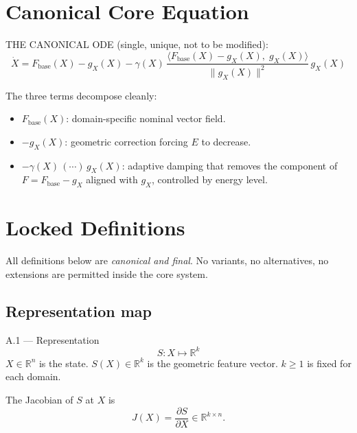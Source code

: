 \documentclass[11pt,oneside]{amsart}
\def\textbf#1{#1}%
\theoremstyle{plain}
\theoremstyle{definition}
\newcommand{\Xdot}{\dot{X}}
\newcommand{\gX}{g_X}
\newcommand{\Fbase}{F_{\mathrm{base}}}
\newcommand{\R}{\mathbb{R}}
\begin{document}
\section{Canonical Core Equation}
\label{sec:core}

\begin{lockbox}
\textbf{THE CANONICAL ODE (single, unique, not to be modified):}
\[
\boxed{
  \Xdot
  = \Fbase(X)
    - \gX(X)
    - \gamma(X)\,
      \frac{\langle \Fbase(X) - \gX(X),\; \gX(X)\rangle}
           {\|\gX(X)\|^{2}}\,
      \gX(X)
}
\]
\end{lockbox}

\noindent The three terms decompose cleanly:
\begin{itemize}[leftmargin=1.8em]
  \item $\Fbase(X)$: domain-specific nominal vector field.
  \item $-\gX(X)$: geometric correction forcing $E$ to decrease.
  \item $-\gamma(X)\,(\cdots)\,\gX(X)$: adaptive damping that removes the
        component of $F = \Fbase - \gX$ aligned with $\gX$, controlled by
        energy level.
\end{itemize}

\section{Locked Definitions}
\label{sec:defs}

All definitions below are \emph{canonical and final}. No variants, no
alternatives, no extensions are permitted inside the core system.

\subsection{Representation map}
\label{sec:rep}

\begin{defbox}{A.1 --- Representation}
\[
\boxed{S : X \longmapsto \R^{k}}
\]
$X \in \R^{n}$ is the state.
$S(X) \in \R^{k}$ is the geometric feature vector.
$k \geq 1$ is fixed for each domain.
\end{defbox}

\noindent The Jacobian of $S$ at $X$ is
\[
  J(X) = \frac{\partial S}{\partial X} \in \R^{k \times n}.
\]
\end{document}
